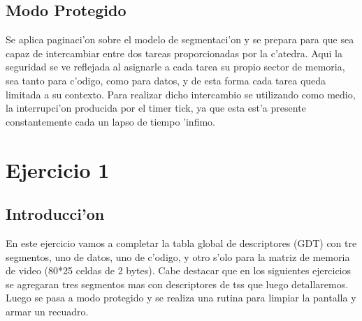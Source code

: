\documentclass[11pt]{article}
\begin{document}
\subsection{Modo Protegido}
Se aplica paginaci'on sobre el modelo de segmentaci'on y se prepara para que sea capaz de intercambiar entre dos tareas proporcionadas por la c'atedra. Aqui la seguridad se ve reflejada al asignarle a cada tarea su propio sector de memoria, sea tanto para c'odigo, como para datos, y de esta forma cada tarea queda limitada a su contexto. Para realizar dicho intercambio se utilizando como medio, la interrupci'on producida por el timer tick, ya que esta est'a presente constantemente cada un lapso de tiempo 'infimo.

\section{Ejercicio 1}
\subsection{Introducci'on} En este ejercicio vamos a completar la tabla global de descriptores (GDT) con tre segmentos, uno de datos, uno de c'odigo, y otro s'olo para la matriz de memoria de video (80*25 celdas de 2 bytes). Cabe destacar que en los siguientes ejercicios se agregaran tres segmentos mas con descriptores de tss que luego detallaremos. Luego se pasa a modo protegido y se realiza una rutina para limpiar la pantalla y armar un recuadro.
\end{document}
